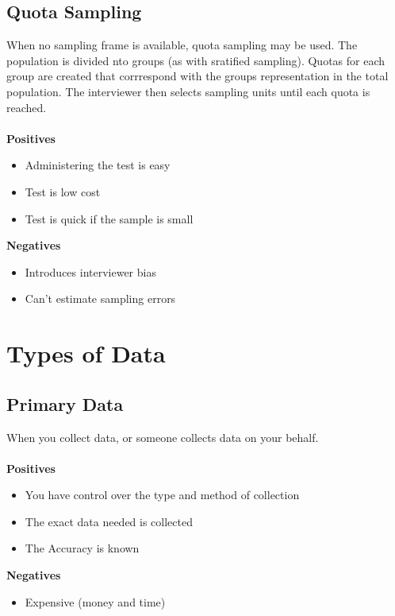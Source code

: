 \documentclass{article}
\begin{document}
\begin{description}
		\subsection{Quota Sampling}
			When no sampling frame is available, quota sampling may be used. The population is divided nto groups (as with sratified sampling). Quotas for each group are created that corrrespond with the groups representation in the total population. The interviewer then selects sampling units until each quota is reached. \\\\
			\textbf{Positives}
                        \begin{itemize}
				\item Administering the test is easy
				\item Test is low cost
				\item Test is quick if the sample is small
                        \end{itemize}
                        \textbf{Negatives}
                        \begin{itemize}
                        	\item Introduces interviewer bias
				\item Can't estimate sampling errors
                        \end{itemize}
	\section{Types of Data}
		\subsection{Primary Data}
			When you collect data, or someone collects data on your behalf. \\\\
			\textbf{Positives}
                        \begin{itemize}
				\item You have control over the type and method of collection
				\item The exact data needed is collected
				\item The Accuracy is known
                        \end{itemize}
                        \textbf{Negatives}
                        \begin{itemize}
                        	\item Expensive (money and time)
                        \end{itemize}

\end{description}
\end{document}
